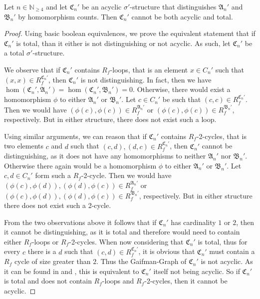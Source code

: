 \begin{lemma}
	Let $n\in\mathbb N_{\geq 4}$ and let $\mathfrak C_n'$ be an acyclic $\sigma'$-structure that distinguishes $\mathfrak A_n'$ and $\mathfrak B_n'$ by homomorphism counts.
	Then $\mathfrak C_n'$ cannot be both acyclic and total.
	\label{lem:totalityNotEnforcable}
\end{lemma}
\begin{proof}
	Using basic boolean equivalences, we prove the equivalent statement that if $\mathfrak C_n'$ is total, than it either is not distinguishing or not acyclic.
	As such, let $\mathfrak C_n'$ be a total $\sigma'$-structure.
	
	We observe that if $\mathfrak C_n'$ contains $R_f$-loops, that is an element $x\in C_n'$ such that $(x, x)\in R_f^{\mathfrak C_n'}$, then $\mathfrak C_n'$ is not distinguishing.
	In fact, then we have $\hom(\mathfrak C_n',\mathfrak A_n')=\hom(\mathfrak C_n',\mathfrak B_n')=0$.
	Otherwise, there would exist a homomorphism $\phi$ to either $\mathfrak A_n'$ or $\mathfrak B_n'$.
	Let $c\in C_n'$ be such that $(c,c)\in R_f^{\mathfrak C_n'}$.
	Then we would have $(\phi(c),\phi(c))\in R_f^{\mathfrak A_n'}$ or $(\phi(c),\phi(c))\in R_f^{\mathfrak B_n'}$, respectively.
	But in either structure, there does not exist such a loop.
	
	Using similar arguments, we can reason that if $\mathfrak C_n'$ contains $R_f$-2-cycles, that is two elements $c$ and $d$ such that $(c, d), (d, c)\in R_f^{\mathfrak C_n'}$, then $\mathfrak C_n'$ cannot be distinguishing, as it does not have any homomorphisms to neither $\mathfrak A_n'$ nor $\mathfrak B_n'$.
	Otherwise there again would be a homomorphism $\phi$ to either $\mathfrak A_n'$ or $\mathfrak B_n'$.
	Let $c,d\in C_n'$ form such a $R_f$-2-cycle.
	Then we would have $(\phi(c),\phi(d)),(\phi(d),\phi(c))\in R_f^{\mathfrak A_n'}$ or $(\phi(c),\phi(d)),(\phi(d),\phi(c))\in R_f^{\mathfrak B_n'}$, respectively.
	But in either structure there does not exist such a 2-cycle.
	
	From the two observations above it follows that if $\mathfrak C_n'$ has cardinality $1$ or $2$, then it cannot be distinguishing, as it is total and therefore would need to contain either $R_f$-loops or $R_f$-2-cycles.
	When now considering that $\mathfrak C_n'$ is total, thus for every $c$ there is a $d$ such that $(c,d)\in R_f^{\mathfrak C_n'}$, it is obvious that $\mathfrak C_n'$ must contain a $R_f$ cycle of size greater than $2$.
	Thus the Gaifman-Graph of $\mathfrak C_n'$ is not acyclic. 
	As it can be found in \cite{scheidt2025ColorRefinement} and \cite{brault-baron2014HypergraphAcyclicity}, this is equivalent to $\mathfrak C_n'$ itself not being acyclic.
	So if $\mathfrak C_n'$ is total and does not contain $R_f$-loops and $R_f$-2-cycles, then it cannot be acyclic.
\end{proof}

